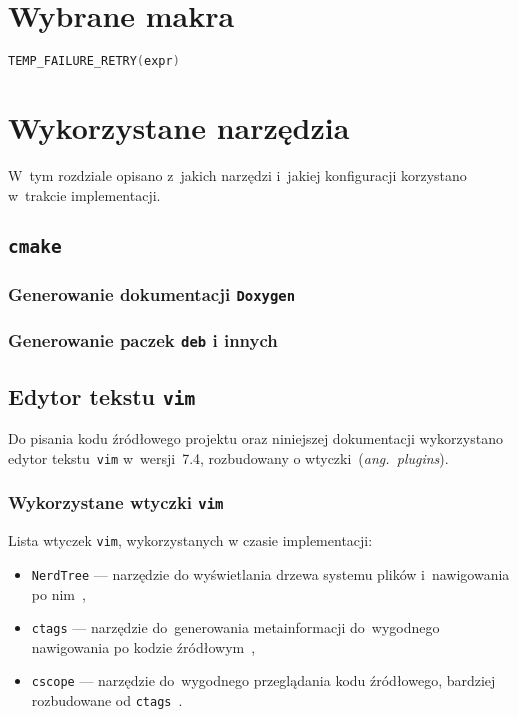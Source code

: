 \documentclass[thesis]{subfiles}
\begin{document}
\section{Wybrane makra}

\begin{lstlisting}[language=c,numbers=none,caption={Makro wykonujące wyrażenie dopóki kod błędu jest równy \texttt{EINTR}}]
TEMP_FAILURE_RETRY(expr)
\end{lstlisting}

\section{Wykorzystane narzędzia}

W~tym rozdziale opisano z~jakich narzędzi i~jakiej konfiguracji korzystano w~trakcie implementacji.

\subsection{\texttt{cmake}}
\subsubsection{Generowanie dokumentacji \texttt{Doxygen}}
\subsubsection{Generowanie paczek \texttt{deb} i innych}

\subsection{Edytor tekstu \texttt{vim}}

Do pisania kodu źródłowego projektu oraz niniejszej dokumentacji wykorzystano edytor tekstu~\texttt{vim} w~wersji~7.4, rozbudowany o wtyczki~(\emph{ang.~plugins}).

\subsubsection{Wykorzystane wtyczki \texttt{vim}}

\noindent Lista wtyczek \texttt{vim}, wykorzystanych w czasie implementacji:
\begin{itemize}
	\item\texttt{NerdTree} --- narzędzie do wyświetlania drzewa systemu plików i~nawigowania po nim~\cite{nerdtree-vimorg,nerdtree-github},
	\item\texttt{ctags} --- narzędzie do~generowania metainformacji do~wygodnego nawigowania po kodzie źródłowym~\cite{ctags},
	\item\texttt{cscope} --- narzędzie do~wygodnego przeglądania kodu źródłowego, bardziej rozbudowane od \texttt{ctags}~\cite{cscope}.
\end{itemize}
\end{document}
